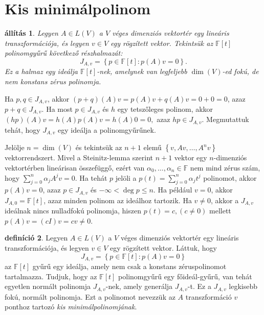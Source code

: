 \documentclass[a4paper, showtrims]{memoir}
\makeatletter
\renewenvironment{proof}[1][\proofname]
    {\par\pushQED{\qed}%
    \normalfont \topsep6\p@\@plus6\p@\relax
    \trivlist
    \item[\hskip\labelsep
        \itshape
    #1\@addpunct{:}]\ignorespaces}
    {\popQED\endtrivlist\@endpefalse}
\theoremstyle{plain}
\newtheorem{proposition}{állítás}[chapter]
\theoremstyle{remark}
\theoremstyle{definition}
\newtheorem{definition}[proposition]{definíció}
\makeatother
\begin{document}
\section{Kis minimálpolinom}
\begin{proposition}
	Legyen $A\in L\left( V \right)$ a $V$ véges dimenziós vektortér egy lineáris transzformációja,
	és legyen $v\in V$ egy rögzített vektor.
	Tekintsük az
	$\mathbb{F}\left[ t \right]$ polinomgyűrű következő részhalmazát:
	\[
		J_{A,v}
		=
		\left\{ p\in\mathbb{F}\left[ t \right]:p\left( A \right)v=0 \right\}.
	\]
	Ez a halmaz egy ideálja $\mathbb{F}\left[ t \right]$-nek,
	amelynek van legfeljebb $\dim(V)$-ed fokú, de nem konstans zérus polinomja.
\end{proposition}
\begin{proof}
	Ha $p,q\in J_{A,v}$,
	akkor
	$\left( p+q \right)(A)v=p\left( A \right)v+q\left( A \right)v=0+0=0$,
	azaz $p+q\in J_{A,v}$.
	Ha most $p\in J_{A,v}$ és $h$ egy tetszőleges polinom,
	akkor
	$
		\left( hp \right)(A)v=h\left( A \right)p\left( A \right)v=h\left( A \right)0=0,
	$
	azaz $hp\in J_{A,v}$.
	Megmutattuk tehát, hogy $J_{A,v}$ egy ideálja a polinomgyűrűnek.

	Jelölje $n=\dim(V)$ és tekintsük az $n+1$ elemű
	$\left\{ v,Av,\ldots,A^nv \right\}$ vektorrendszert.
	Mivel a Steinitz-lemma szerint 
	$n+1$ vektor egy $n$-dimenziós vektortérben lineárisan összefüggő,
	ezért van
	$\alpha_0,\ldots,\alpha_n\in\mathbb{F}$ nem mind zérus szám, hogy
	$\sum_{j=0}^n\alpha_jA^jv=0$.
	Ha tehát $p$ jelöli a $p\left( t \right)=\sum_{j=0}^n\alpha_jt^j$ polinomot,
	akkor
	$p\left( A \right)v=0$, azaz $p\in J_{A,v}$ és $-\infty<\deg p\leq n$.
\end{proof}
Ha például $v=0$, akkor $J_{A,0}=\mathbb{F}\left[ t \right]$, azaz minden polinom
az ideálhoz tartozik.
Ha $v\neq 0$,
akkor a $J_{A,v}$ ideálnak nincs nulladfokú polinomja,
hiszen $p(t)=c, (c\neq 0)$ mellett
$p\left( A \right)v=(cI)v=cv\neq 0$.

\begin{definition}
	Legyen $A\in L\left( V \right)$ a $V$ véges dimenziós vektortér egy lineáris transzformációja,
	és legyen $v\in V$ egy rögzített vektor.
	Láttuk, hogy
	\[
		J_{A,v}
		=
		\left\{ p\in\mathbb{F}\left[ t \right]:p\left( A \right)v=0 \right\}
	\]
	az $\mathbb{F}\left[ t \right]$ gyűrű egy ideálja, amely nem csak a konstans zéruspolinomot tartalmazza.
	Tudjuk, hogy az $\mathbb{F}\left[ t \right]$ polinomgyűrű egy főideál-gyűrű,
	van tehát egyetlen normált polinomja $J_{A,v}$-nek, amely generálja $J_{A,v}$-t.
	Ez a $J_{A,v}$ legkisebb fokú, normált polinomja.
	Ezt a polinomot nevezzük az $A$ transzformáció $v$ ponthoz tartozó
    \emph{kis minimálpolinomjának}\label{def:kisminimal}.
\end{definition}
\end{document}
